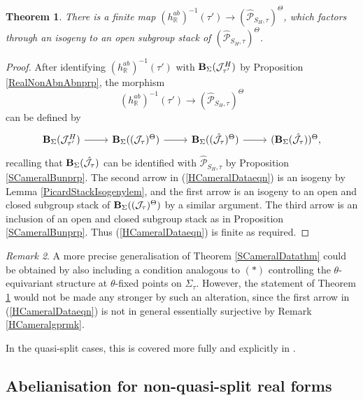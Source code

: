 \documentclass{amsart}
\newtheorem{theorem}{Theorem}
\theoremstyle{remark}
\newtheorem{remark}[theorem]{Remark}
\numberwithin{theorem}{section}
\numberwithin{equation}{section}
\begin{document}
\begin{theorem}\label{HCameralDatathm}
    There is a finite map $({ h}_{\mathbb{R}}^{ab})^{-1}(\tau') \rightarrow (\hat{\mathcal P}_{S_H,\tau})^\Theta$, which factors through an isogeny to an open subgroup stack of $(\hat{\mathcal P}_{S_H,\tau})^\Theta$.
\end{theorem}

\begin{proof} 
After identifying $({ h}_{\mathbb{R}}^{ab})^{-1}(\tau')$ with ${\bf B}_{\Sigma}(\mathcal J^H_{\tau'})$ by Proposition \ref{RealNonAbnAbnprp}, the morphism 
$$({ h}_{\mathbb{R}}^{ab})^{-1}(\tau') \rightarrow (\hat{\mathcal P}_{S_H,\tau})^\Theta$$
can be defined by
\begin{equation}\label{HCameralDataeqn}
\begin{tikzcd}
{\bf B}_{\Sigma}(\mathcal J^H_{\tau'}) \arrow[r] & {\bf B}_{\Sigma}((\mathcal J_{\tau})^\Theta) \arrow[r] & {\bf B}_{\Sigma}((\hat{\mathcal J}_{\tau})^\Theta) \arrow[r] & ({\bf B}_{\Sigma}(\hat{\mathcal J}_{\tau}))^\Theta,
\end{tikzcd}
\end{equation}
recalling that ${\bf B}_{\Sigma}(\hat{\mathcal J}_{\tau})$ can be identified with $\hat{\mathcal P}_{S_H,\tau}$ by Proposition \ref{SCameralBunprp}. The second arrow in (\ref{HCameralDataeqn}) is an isogeny by Lemma \ref{PicardStackIsogenylem}, and the first arrow is an isogeny to an open and closed subgroup stack of ${\bf B}_{\Sigma}((\mathcal J_{\tau})^\Theta)$ by a similar argument. The third arrow is an inclusion of an open and closed subgroup stack as in Proposition \ref{SCameralBunprp}. Thus (\ref{HCameralDataeqn}) is finite as required.
\end{proof}

\begin{remark}\label{HCameralDatarmk}
    A more precise generalisation of Theorem \ref{SCameralDatathm} could be obtained by also including a condition analogous to $(*)$ controlling the $\theta$-equivariant structure at $\theta$-fixed points on $\hat\Sigma_\tau$. However, the statement of Theorem \ref{HCameralDatathm} would not be made any stronger by such an alteration, since the first arrow in (\ref{HCameralDataeqn}) is not in general essentially surjective by Remark \ref{HCameralgprmk}. 
\end{remark}

In the quasi-split cases, this is covered more fully and explicitly in \cite{GPPN}.

\subsection{Abelianisation for non-quasi-split real forms}\label{NonQSRealFormsbn}
\end{document}

